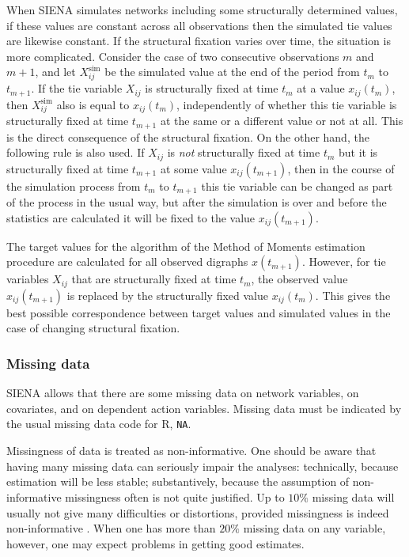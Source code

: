 \documentclass[a4paper,fleqn,11pt]{article}
\newcommand{\+}{\, + \,}
\newcommand{\Rn}{{\sf R}}
\newcommand{\SI}{{\sf SIENA }}
\begin{document}
When \SI simulates networks including some structurally determined values,
if these values are constant across all observations then
the simulated tie values are likewise constant.
If the structural fixation varies over time, the situation
is more complicated.
Consider the case of two consecutive observations
$m$ and $m+1$,
and let $X^{\text{sim}}_{ij}$ be the simulated value
at the end of the period from $t_m$ to $t_{m+1}$.
If the tie variable $X_{ij}$ is structurally fixed at time $t_m$
at a value $x_{ij}(t_m)$,
then $X^{\text{sim}}_{ij}$ also is equal to $x_{ij}(t_m)$,
independently of whether this tie variable is structurally fixed
at time $t_{m+1}$ at the same or a different value or not at all.
This is the direct consequence of the structural fixation.
On the other hand, the following rule is also used.
If $X_{ij}$ is \emph{not} structurally fixed at time $t_m$
but it is structurally fixed at time $t_{m+1}$ at some value $x_{ij}(t_{m+1})$,
then in the course of the simulation process from  $t_m$ to $t_{m+1}$
this tie variable can be changed as part of the process in the usual way,
but after the simulation is over and before the statistics are calculated it will be fixed
to the value $x_{ij}(t_{m+1})$.

The target values for the algorithm of the Method of Moments estimation
procedure are calculated for all observed digraphs $x(t_{m+1})$.
However, for tie variables $X_{ij}$ that are
structurally fixed at time $t_m$, the observed value  $x_{ij}(t_{m+1})$
is replaced by the structurally fixed value  $x_{ij}(t_{m})$.
This gives the best possible correspondence between target values
and simulated values in the case of changing structural fixation.


\subsubsection{Missing data}
\label{S_missing}

\SI allows that there are some missing data on network variables,
on covariates, and on dependent action
variables.  Missing data must be indicated by
the usual missing data code for \Rn, \texttt{NA}.

Missingness of data is treated as non-informative.
One should be aware that having many missing data can seriously
impair the analyses: technically, because estimation will be
less stable; substantively, because the assumption of
non-informative missingness often is not quite justified.
Up to $10\%$ missing data will usually not give many difficulties
or distortions, provided missingness is indeed non-informative
\citep{HuismanSteglich08}.
When one has more than $20\%$ missing data on any variable, however,
one may expect problems in getting good estimates.
\end{document}
